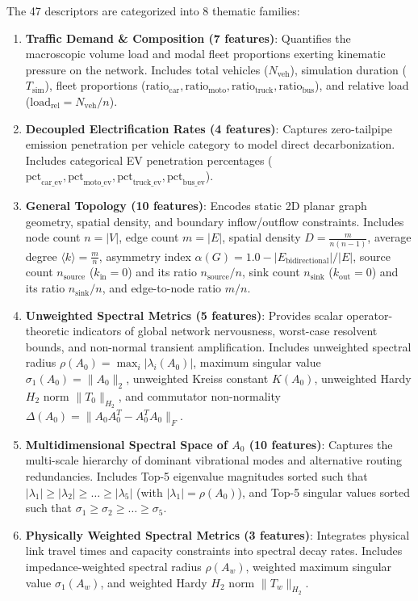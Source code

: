 \documentclass[lettersize,journal]{IEEEtran}
\begin{document}
The 47 descriptors are categorized into 8 thematic families:
\begin{enumerate}
    \item \textbf{Traffic Demand \& Composition (7 features)}: Quantifies the macroscopic volume load and modal fleet proportions exerting kinematic pressure on the network. Includes total vehicles ($N_{\text{veh}}$), simulation duration ($T_{\text{sim}}$), fleet proportions ($\text{ratio}_{\text{car}}, \text{ratio}_{\text{moto}}, \text{ratio}_{\text{truck}}, \text{ratio}_{\text{bus}}$), and relative load ($\text{load}_{\text{rel}} = N_{\text{veh}} / n$).
    \item \textbf{Decoupled Electrification Rates (4 features)}: Captures zero-tailpipe emission penetration per vehicle category to model direct decarbonization. Includes categorical EV penetration percentages ($\text{pct}_{\text{car\_ev}}, \text{pct}_{\text{moto\_ev}}, \text{pct}_{\text{truck\_ev}}, \text{pct}_{\text{bus\_ev}}$).
    \item \textbf{General Topology (10 features)}: Encodes static 2D planar graph geometry, spatial density, and boundary inflow/outflow constraints. Includes node count $n = |V|$, edge count $m = |E|$, spatial density $D = \frac{m}{n(n-1)}$, average degree $\langle k \rangle = \frac{m}{n}$, asymmetry index $\alpha(G) = 1.0 - |E_{\text{bidirectional}}|/|E|$, source count $n_{\text{source}}$ ($k_{\text{in}} = 0$) and its ratio $n_{\text{source}}/n$, sink count $n_{\text{sink}}$ ($k_{\text{out}} = 0$) and its ratio $n_{\text{sink}}/n$, and edge-to-node ratio $m/n$.
    \item \textbf{Unweighted Spectral Metrics (5 features)}: Provides scalar operator-theoretic indicators of global network nervousness, worst-case resolvent bounds, and non-normal transient amplification. Includes unweighted spectral radius $\rho(A_0) = \max_i |\lambda_i(A_0)|$, maximum singular value $\sigma_1(A_0) = \|A_0\|_2$, unweighted Kreiss constant $K(A_0)$, unweighted Hardy $H_2$ norm $\|T_0\|_{H_2}$, and commutator non-normality $\Delta(A_0) = \|A_0 A_0^T - A_0^T A_0\|_F$.
    \item \textbf{Multidimensional Spectral Space of $A_0$ (10 features)}: Captures the multi-scale hierarchy of dominant vibrational modes and alternative routing redundancies. Includes Top-5 eigenvalue magnitudes sorted such that $|\lambda_1| \ge |\lambda_2| \ge \dots \ge |\lambda_5|$ (with $|\lambda_1| = \rho(A_0)$), and Top-5 singular values sorted such that $\sigma_1 \ge \sigma_2 \ge \dots \ge \sigma_5$.
    \item \textbf{Physically Weighted Spectral Metrics (3 features)}: Integrates physical link travel times and capacity constraints into spectral decay rates. Includes impedance-weighted spectral radius $\rho(A_w)$, weighted maximum singular value $\sigma_1(A_w)$, and weighted Hardy $H_2$ norm $\|T_w\|_{H_2}$.

\end{enumerate}
\end{document}
